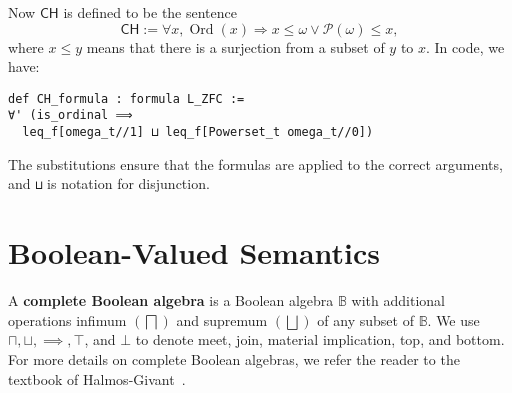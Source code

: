 \documentclass[sigplan,screen]{acmart}
\newcommand{\B}{\mathbb{B}}
\newcommand{\lil}{\lstinline}
\newcommand{\ZFC}{\mathsf{ZFC}}
\newcommand{\CH}{\mathsf{CH}}
\theoremstyle{definition}
\DeclareMathOperator{\Ord}{Ord}
\begin{document}




Now \(\CH\) is defined to be the sentence
\[\CH:=\forall x, \Ord(x) \Rightarrow x \le \omega \vee \mathcal{P}(\omega) \le x,\]
where \(x \le y\) means that there is a surjection from a subset of \(y\) to \(x\). In code, we have:
\begin{lstlisting}
def CH_formula : formula L_ZFC :=
∀' (is_ordinal ⟹
  leq_f[omega_t//1] ⊔ leq_f[Powerset_t omega_t//0])
\end{lstlisting}
The substitutions ensure that the formulas are applied to the correct arguments, and \lil{⊔} is notation for disjunction.

\section{Boolean-Valued Semantics}
\label{sect:boolean-semantics}
A \textbf{complete Boolean algebra} is a Boolean algebra $\B$ with additional operations infimum $(\bigsqcap)$ and supremum $(\bigsqcup)$ of any subset of $\B$.
We use $\sqcap, \sqcup, \implies, \top$, and $\bot$ to denote meet, join, material implication, top, and bottom. For more details on complete Boolean algebras, we refer the reader to the textbook of Halmos-Givant~\cite{givant2008introduction}.
\end{document}
